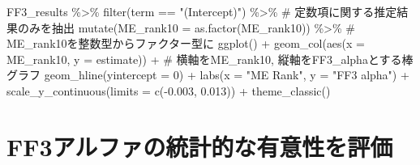 \documentclass[
  letterpaper,
  DIV=11,
  numbers=noendperiod]{scrreprt}
\newenvironment{Shaded}{\begin{snugshade}}{\end{snugshade}}
\newcommand{\AttributeTok}[1]{\textcolor[rgb]{0.40,0.45,0.13}{#1}}
\newcommand{\CommentTok}[1]{\textcolor[rgb]{0.37,0.37,0.37}{#1}}
\newcommand{\DecValTok}[1]{\textcolor[rgb]{0.68,0.00,0.00}{#1}}
\newcommand{\FloatTok}[1]{\textcolor[rgb]{0.68,0.00,0.00}{#1}}
\newcommand{\FunctionTok}[1]{\textcolor[rgb]{0.28,0.35,0.67}{#1}}
\newcommand{\NormalTok}[1]{\textcolor[rgb]{0.00,0.23,0.31}{#1}}
\newcommand{\SpecialCharTok}[1]{\textcolor[rgb]{0.37,0.37,0.37}{#1}}
\newcommand{\StringTok}[1]{\textcolor[rgb]{0.13,0.47,0.30}{#1}}
\begin{document}
\begin{Shaded}
\begin{Highlighting}[]
\NormalTok{FF3\_results }\SpecialCharTok{\%\textgreater{}\%} 
  \FunctionTok{filter}\NormalTok{(term }\SpecialCharTok{==} \StringTok{"(Intercept)"}\NormalTok{) }\SpecialCharTok{\%\textgreater{}\%} \CommentTok{\# 定数項に関する推定結果のみを抽出}
  \FunctionTok{mutate}\NormalTok{(}\AttributeTok{ME\_rank10 =} \FunctionTok{as.factor}\NormalTok{(ME\_rank10)) }\SpecialCharTok{\%\textgreater{}\%} \CommentTok{\# ME\_rank10を整数型からファクター型に}
  \FunctionTok{ggplot}\NormalTok{() }\SpecialCharTok{+}
  \FunctionTok{geom\_col}\NormalTok{(}\FunctionTok{aes}\NormalTok{(}\AttributeTok{x =}\NormalTok{ ME\_rank10, }\AttributeTok{y =}\NormalTok{ estimate)) }\SpecialCharTok{+} \CommentTok{\# 横軸をME\_rank10, 縦軸をFF3\_alphaとする棒グラフ}
  \FunctionTok{geom\_hline}\NormalTok{(}\AttributeTok{yintercept =} \DecValTok{0}\NormalTok{) }\SpecialCharTok{+} 
  \FunctionTok{labs}\NormalTok{(}\AttributeTok{x =} \StringTok{"ME Rank"}\NormalTok{, }\AttributeTok{y =} \StringTok{"FF3 alpha"}\NormalTok{) }\SpecialCharTok{+} 
  \FunctionTok{scale\_y\_continuous}\NormalTok{(}\AttributeTok{limits =} \FunctionTok{c}\NormalTok{(}\SpecialCharTok{{-}}\FloatTok{0.003}\NormalTok{, }\FloatTok{0.013}\NormalTok{)) }\SpecialCharTok{+}
  \FunctionTok{theme\_classic}\NormalTok{()}
\end{Highlighting}
\end{Shaded}

\section{FF3アルファの統計的な有意性を評価}\label{ff3ux30a2ux30ebux30d5ux30a1ux306eux7d71ux8a08ux7684ux306aux6709ux610fux6027ux3092ux8a55ux4fa1}
\end{document}
